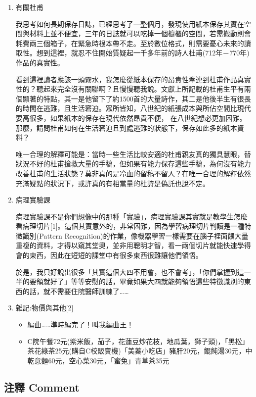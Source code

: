 \documentclass[a5paper, 12pt
]{book}
\providecommand{\tightlist}{%
  \setlength{\itemsep}{0pt}\setlength{\parskip}{0pt}}
\begin{document}
\begin{enumerate}
\def\labelenumi{\arabic{enumi}.}
\item
  有關杜甫

  我思考如何長期保存日誌，已經思考了一整個月，發現使用紙本保存其實在空間與材料上並不便宜，三年的日誌就可以吃掉一個櫥櫃的空間，若需搬動則會耗費兩三個箱子，在緊急時根本帶不走。至於數位格式，則需要憂心未來的讀取性。想到這裡，就忍不住開始質疑起一千多年前的詩人杜甫(712年－770年)作品的真實性。

  看到這裡讀者應該一頭霧水，我怎麼從紙本保存的昂貴性牽連到杜甫作品真實性的？聽起來完全沒有關聯啊？且慢慢聽我說。文獻上所記載的杜甫生平有兩個顯著的特點，其一是他留下了約1500首的大量詩作，其二是他後半生有很長的時間在逃難，且生活窘迫。眾所皆知，八世紀的紙張成本與所佔空間比現代要高很多，如果紙本的保存在現代依然昂貴不便，
  在八世紀想必更加困難。那麼，請問杜甫如何在生活窘迫且到處逃難的狀態下，保存如此多的紙本資料？

  唯一合理的解釋可能是：當時一些生活比較安適的杜甫親友真的獨具慧眼，替狀況不好的杜甫搶救大量的手稿，但如果有能力保存這些手稿，為何沒有能力改善杜甫的生活狀態？莫非真的是冷血的留稿不留人？在唯一合理的解釋依然充滿疑點的狀況下，或許真的有相當量的杜詩是偽託也說不定。
\item
  病理實驗課

  病理實驗課不是你們想像中的那種「實驗」，病理實驗課其實就是教學生怎麼看病理切片{[}1{]}。這個其實意外的，非常困難，因為學習病理切片判讀是一種特徵識別(Pattern
  Recognition)的作業，像機器學習一樣需要在腦子裡面餵大量重複的資料，才得以窺其堂奧，並非用聰明才智，看一兩個切片就能快速學得會的東西，因此在短短的課堂中有很多東西很難讓他們領悟。

  於是，我只好說出很多「其實這個大四不用會，也不會考」，「你們掌握到這一半的要領就好了」等等安慰的話，畢竟如果大四就能夠領悟這些特徵識別的東西的話，就不需要住院醫師訓練了\ldots\ldots{}
\item
  雜記:物價與其他{[}2{]}

  \begin{itemize}
  \tightlist
  \item
    編曲\ldots\ldots 準時編完了！叫我編曲王！
  \item
    C院午餐72元(紫米飯，茄子，花蓮豆炒花枝，地瓜葉，獅子頭)，「黑松」茶花綠茶25元(購自C校販賣機)「美蓁小吃店」豬肝20元，餛飩湯30元，中乾意麵60元，空心菜30元，「蜜兔」青草茶35元
  \end{itemize}
\end{enumerate}

\hypertarget{ux6ce8ux91cb-comment-26}{%
\subsection{注釋 Comment}\label{ux6ce8ux91cb-comment-26}}
\end{document}
